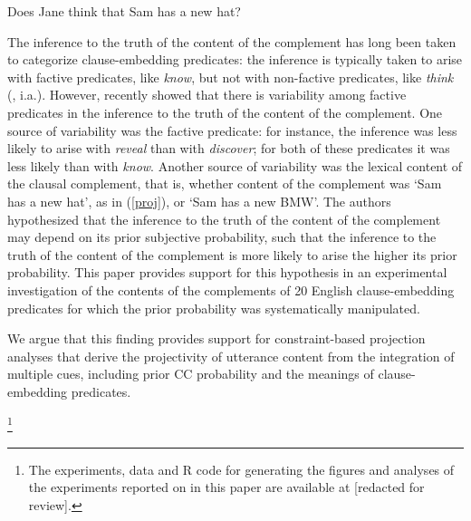 \documentclass[11pt,fleqn]{article}
\newcommand{\6}{\mbox{$[\hspace*{-.6mm}[$}}
\newcommand{\9}{\mbox{$]\hspace*{-.6mm}]$}}
\begin{document}
\begin{exe}
\ex\label{proj2} Does Jane think that Sam has a new hat?
\end{exe}
The inference to the truth of the content of the complement has long been taken to categorize clause-embedding predicates: the inference is typically taken to arise with factive predicates, like {\em know}, but not with non-factive predicates, like {\em think} (\citealt{kiparsky-kiparsky70,karttunen71b}, i.a.). However, \citealt*{tbd-variability} recently showed that there is variability among factive predicates in the inference to the truth of the content of the complement. One source of variability was the factive predicate: for instance, the inference was less likely to arise with {\em reveal} than with {\em discover}; for both of these predicates it was less likely than with {\em know}. Another source of variability was the lexical content of the clausal complement, that is, whether content of the complement was `Sam has a new hat', as in (\ref{proj}), or `Sam has a new BMW'. The authors hypothesized that the inference to the truth of the content of the complement may depend on its prior subjective probability, such that the inference to the truth of the content of the complement is more likely to arise the higher its prior probability. This paper provides support for this hypothesis in an experimental investigation of the contents of the complements of 20 English clause-embedding predicates for which the prior probability was systematically manipulated. 

\newpage

We argue that this finding provides support for constraint-based projection analyses that derive the projectivity of utterance content from the integration of multiple cues, including prior CC probability and the meanings of clause-embedding predicates.

\footnote{\label{f-github}The experiments, data and R code for generating the figures and analyses of the experiments reported on in this paper are available at [redacted for review].}
\end{document}
